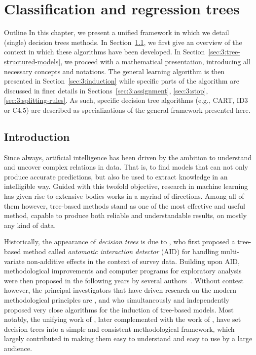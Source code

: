 \chapter{Classification and regression trees}\label{ch:cart}

\begin{remark}{Outline}
In this chapter, we present a unified framework in which we detail (single)
decision trees methods. In Section~\ref{sec:3:introduction}, we first give an
overview of the context in which these algorithms have been developed. In
Section~\ref{sec:3:tree-structured-models}, we proceed with a mathematical
presentation, introducing all necessary concepts and notations. The general
learning algorithm is then presented in Section~\ref{sec:3:induction} while
specific parts of the algorithm are discussed in finer details in
Sections~\ref{sec:3:assignment}, \ref{sec:3:stop}, \ref{sec:3:splitting-rules}.
As such, specific decision tree algorithms (e.g., CART, ID3 or C4.5) are described as
specializations of the general framework presented here.
\end{remark}

\section{Introduction}
\label{sec:3:introduction}

Since always, artificial intelligence has been driven by the ambition to
understand and uncover complex relations in data. That is, to find models that
can not only produce accurate predictions, but also be used to extract
knowledge in an intelligible way. Guided with this twofold objective, research
in machine learning has given rise to extensive bodies works in a myriad of
directions. Among all of them however, tree-based methods stand as one of
the most effective and useful method, capable to produce both reliable and
understandable results, on mostly any kind of data.

Historically, the appearance of \textit{decision trees} is due to
\citet{morgan:1963}, who first proposed a tree-based method called
\textit{automatic interaction detector} (AID) for handling multi-variate
non-additive effects in the context of survey data. Building upon AID,
methodological improvements and computer programs for exploratory analysis were
then proposed in the following years by several
authors~\citep{sonquist:1970,messenger:1972,gillo:1972,sonquist:1974}. Without
contest however, the principal investigators that have driven research on the modern
methodological principles are \citet{breiman:1978a,breiman:1978b},
\citet{friedman:1977,friedman:1979} and \citet{quinlan:1979,quinlan:1986} who
simultaneously and independently proposed very close algorithms for the
induction of tree-based models. Most notably, the unifying work of
\citet{breiman:1984}, later complemented with the work of \citet{quinlan:1993},
have set decision trees into a simple and consistent methodological framework,
which largely contributed in making them easy to understand and easy to use by
a large audience.

